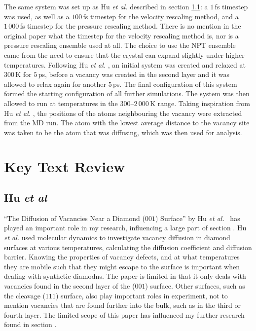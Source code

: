 \documentclass[10pt,a4paper,twocolumn,twoside]{extarticle}
\newcommand{\al}{\emph{et al. }}
\begin{document}
The same system was set up as Hu \al described in section \ref{Hu}: a $1$\,fs timestep was used, as well as a $100$\,fs timestep for the velocity rescaling method, and a $1\,000$\,fs timestep for the pressure rescaling method. There is no mention in the original paper what the timestep for the velocity rescaling method is, nor is a pressure rescaling ensemble used at all. The choice to use the NPT ensemble came from the need to ensure that the crystal can expand slightly under higher temperatures. Following Hu \al, an initial system was created and relaxed at $300$\,K for $5$\,ps, before a vacancy was created in the second layer and it was allowed to relax again for another $5$\,ps. The final configuration of this system formed the starting configuration of all further simulations. The system was then allowed to run at temperatures in the $300$--$2\,000$\,K range. Taking inspiration from Hu \al, the positions of the atoms neighbouring the vacancy were extracted from the MD run. The atom with the lowest average distance to the vacancy site was taken to be the atom that was diffusing, which was then used for analysis. 



\section{Key Text Review}
\subsection{Hu \textit{et al}}
\label{Hu}
``The Diffusion of Vacancies Near a Diamond ($001$) Surface'' by Hu \al~has played an important role in my research, influencing a large part of section . Hu \al used molecular dynamics to investigate vacancy diffusion in diamond surfaces at various temperatures, calculating the diffusion coefficient and diffusion barrier. Knowing the properties of vacancy defects, and at what temperatures they are mobile such that they might escape to the surface is important when dealing with synthetic diamodns. The paper is limited in that it only deals with vacancies found in the second layer of the ($001$) surface. Other surfaces, such as the cleavage ($111$) surface, also play important roles in experiment, not to mention vacancies that are found further into the bulk, such as in the third or fourth layer. The limited scope of this paper has influenced my further research found in section .
\end{document}
